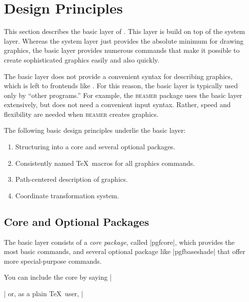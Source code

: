 %
%
%


\section{Design Principles}

This section describes the basic layer of \pgfname. This layer is
build on top of the system layer. Whereas the system layer just
provides the absolute minimum for drawing graphics, the basic
layer provides numerous commands that make it possible to create
sophisticated graphics easily and also quickly.

The basic layer does not provide a convenient syntax for describing
graphics, which is left to frontends like \tikzname. For this reason, the
basic layer is typically used only by ``other programs.'' For example,
the \textsc{beamer} package uses the basic layer extensively, but does
not need a convenient input syntax. Rather, speed and flexibility are
needed when \textsc{beamer} creates graphics.

The following basic design principles underlie the basic layer:
\begin{enumerate}
\item Structuring into a core and several optional packages.
\item Consistently named \TeX\ macros for all graphics commands.
\item Path-centered description of graphics.
\item Coordinate transformation system.
\end{enumerate}



\subsection{Core and Optional Packages}

The basic layer consists of a \emph{core package}, called |pgfcore|,
which provides the most basic commands, and several optional package
like |pgfbaseshade| that offer more special-purpose commands.

You can include the core by saying |\usepackage{pgfcore}| or, as a
plain \TeX\ user, |

